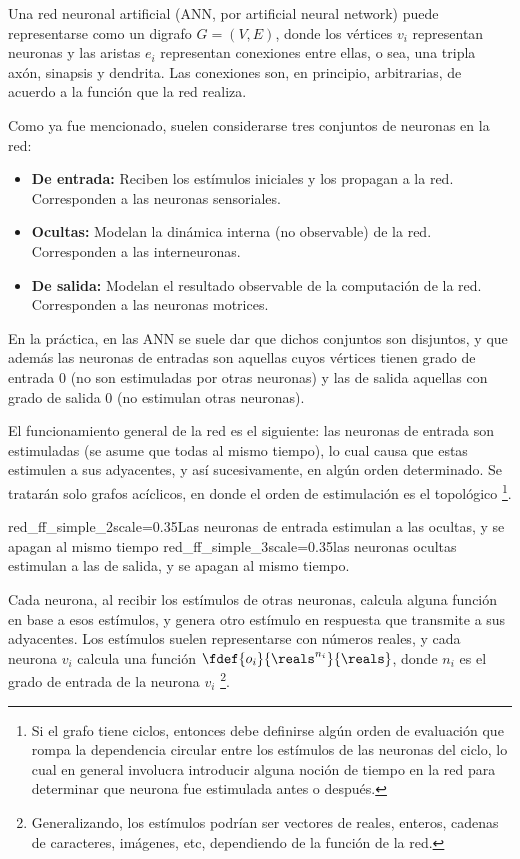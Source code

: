 

Una red neuronal artificial (ANN, por artificial neural network) puede representarse como un digrafo $G=(V,E)$, donde los vértices $v_i$ representan neuronas y las aristas $e_i$ representan conexiones entre ellas, o sea, una tripla axón, sinapsis y dendrita. Las conexiones son, en principio, arbitrarias, de acuerdo a la función que la red realiza.


Como ya fue mencionado, suelen considerarse tres conjuntos de neuronas en la red:

\begin{itemize}
\item \textbf{De entrada:} Reciben los estímulos iniciales y los propagan a la red. Corresponden a las neuronas sensoriales.
\item \textbf{Ocultas:} Modelan la dinámica interna (no observable) de la red. Corresponden a las interneuronas.
\item \textbf{De salida:} Modelan el resultado observable de la computación de la red. Corresponden a las neuronas motrices.
\end{itemize}


En la práctica, en las ANN se suele dar que dichos conjuntos son disjuntos, y que además las neuronas de entradas son aquellas cuyos vértices tienen grado de entrada $0$ (no son estimuladas por otras neuronas) y las de salida aquellas con grado de salida $0$ (no estimulan otras neuronas).


El funcionamiento general de la red es el siguiente: las neuronas de entrada son estimuladas (se asume que todas al mismo tiempo), lo cual causa que estas estimulen a sus adyacentes, y así sucesivamente, en algún orden determinado. Se tratarán solo grafos acíclicos, en donde el orden de estimulación es el topológico \footnote{Si el grafo tiene ciclos, entonces debe definirse algún orden de evaluación que rompa la dependencia circular entre los estímulos de las neuronas del ciclo, lo cual en general involucra introducir alguna noción de tiempo en la red para determinar que neurona fue estimulada antes o después.}. 


{red_ff_simple_2}{scale=0.35}{Las neuronas de entrada estimulan a las ocultas, y se apagan al mismo tiempo}
{red_ff_simple_3}{scale=0.35}{las neuronas ocultas estimulan a las de salida, y se apagan al mismo tiempo.}

Cada neurona, al recibir los estímulos de otras neuronas, calcula alguna función en base a esos estímulos, y genera otro estímulo en respuesta que transmite a sus adyacentes. Los estímulos suelen representarse con números reales, y cada neurona $v_i$ calcula una función $\fdef{o_i}{\reals^{n_i}}{\reals}$, donde $n_i$ es el grado de entrada de la neurona $v_i$ \footnote{Generalizando, los estímulos podrían ser vectores de reales, enteros, cadenas de caracteres, imágenes, etc, dependiendo de la función de la red.}.


